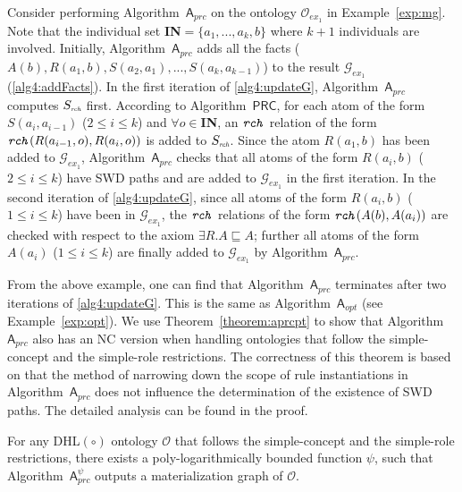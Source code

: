 \begin{example}\label{exp:prc}
Consider performing Algorithm~$\mathsf{A}_{prc}$ on the ontology
$\mathcal{O}_{ex_1}$ in Example~\ref{exp:mg}. Note that the individual
set \textbf{IN}$=\{a_1,...,a_k,b\}$ where $k+1$ individuals are involved.
Initially, Algorithm~$\mathsf{A}_{prc}$ adds
all the facts ($A(b),R(a_1,b),S(a_2,a_1),...,S(a_{k},a_{k-1})$) to the
result $\mathcal{G}_{ex_1}$ (\ref{alg4:addFacts}). In the first iteration of
\ref{alg4:updateG}, Algorithm~$\mathsf{A}_{prc}$ computes $S_{\textit{\tiny rch}}$ first.
According to Algorithm~$\mathsf{PRC}$, for each atom of the form $S(a_i,a_{i-1})$ ($2\leq i\leq k$)
and $\forall o\in$\textbf{IN},
an $\texttt{\emph{rch}}$ relation of the form $\texttt{\emph{rch}}(R(a_{i-1},o),R(a_i,o))$ is added to
$S_{\textit{\tiny rch}}$. Since the atom $R(a_1,b)$ has been added to $\mathcal{G}_{ex_1}$,
Algorithm~$\mathsf{A}_{prc}$ checks that all atoms of the form $R(a_i,b)$ ($2\leq i\leq k$)
have SWD paths and are added to $\mathcal{G}_{ex_1}$ in the first iteration.
In the second iteration of \ref{alg4:updateG}, since all atoms of the form $R(a_i,b)$ ($1\leq i\leq k$)
have been in $\mathcal{G}_{ex_1}$, the $\texttt{\emph{rch}}$ relations of the form $\texttt{\emph{rch}}(A(b),A(a_i))$
are checked with respect to the axiom $\exists R.A\sqsubseteq A$; further all
atoms of the form $A(a_i)$ ($1\leq i\leq k$) are finally added to $\mathcal{G}_{ex_1}$
by Algorithm~$\mathsf{A}_{prc}$.
\end{example}

From the above example, one can find that Algorithm~$\mathsf{A}_{prc}$ terminates after two iterations
of \ref{alg4:updateG}. This is the same as Algorithm~$\mathsf{A}_{opt}$ (see Example~\ref{exp:opt}).
We use Theorem~\ref{theorem:aprcpt} to show that Algorithm~$\mathsf{A}_{prc}$ also has an NC version when handling ontologies
that follow the simple-concept and the simple-role restrictions.
The correctness of this theorem is based on that the method of narrowing down the scope of rule instantiations in Algorithm~$\mathsf{A}_{prc}$
does not influence the determination of the existence of SWD paths. The detailed analysis
can be found in the proof.

\begin{theorem}\label{theorem:aprcpt}
For any DHL$(\circ)$ ontology $\mathcal{O}$ that follows the simple-concept and the simple-role
restrictions,
there exists a poly-logarithmically bounded function $\psi$,
such that Algorithm~$\mathsf{A}_{prc}^{\psi}$ outputs
a materialization graph of $\mathcal{O}$.
\end{theorem}




